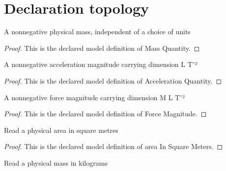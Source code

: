 \section{Declaration topology}
\begin{definition}
  \label{def:physics:phyx-mini-0662:phyxminiproblems-problemphyxmini0662-massquantity}
  A nonnegative physical mass, independent of a choice of units
\end{definition}
\begin{proof}
  This is the declared model definition of Mass Quantity.
\end{proof}
\begin{definition}
  \label{def:physics:phyx-mini-0662:phyxminiproblems-problemphyxmini0662-accelerationquantity}
  A nonnegative acceleration magnitude carrying dimension L T⁻²
\end{definition}
\begin{proof}
  This is the declared model definition of Acceleration Quantity.
\end{proof}
\begin{definition}
  \label{def:physics:phyx-mini-0662:phyxminiproblems-problemphyxmini0662-forcemagnitude}
  A nonnegative force magnitude carrying dimension M L T⁻²
\end{definition}
\begin{proof}
  This is the declared model definition of Force Magnitude.
\end{proof}
\begin{definition}
  \label{def:physics:phyx-mini-0662:phyxminiproblems-problemphyxmini0662-areainsquaremeters}
  Read a physical area in square metres
\end{definition}
\begin{proof}
  This is the declared model definition of area In Square Meters.
\end{proof}
\begin{definition}
  \label{def:physics:phyx-mini-0662:phyxminiproblems-problemphyxmini0662-massinkilograms}
  Read a physical mass in kilograms
\end{definition}
